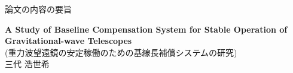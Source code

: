\documentclass[a4paper,oneside,11pt,openright]{book}
\begin{document}
\begin{center}
  {\huge 論文の内容の要旨 \par}
  \vspace{10mm}
         {\LARGE {\bf A Study of Baseline Compensation System for Stable Operation of Gravitational-wave Telescopes}} \\
         \vspace{5mm}       
                {\LARGE (重力波望遠鏡の安定稼働のための基線長補償システムの研究)}\\
                \vspace{10mm}
                       {\LARGE 三代 浩世希}
                       \vspace{2cm}
\end{center}                       

\end{document}
